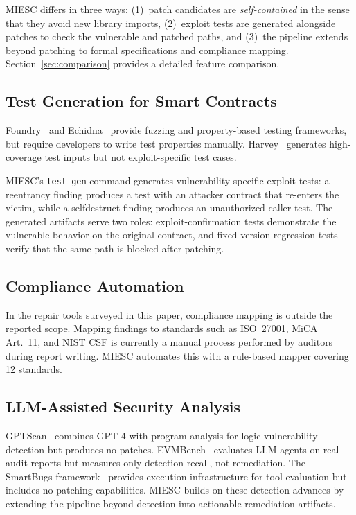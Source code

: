 \documentclass[conference]{IEEEtran}
\begin{document}
MIESC differs in three ways: (1)~patch candidates are \emph{self-contained} in the sense that they avoid new library imports, (2)~exploit tests are generated alongside patches to check the vulnerable and patched paths, and (3)~the pipeline extends beyond patching to formal specifications and compliance mapping. Section~\ref{sec:comparison} provides a detailed feature comparison.

\subsection{Test Generation for Smart Contracts}

Foundry~\cite{foundry2025} and Echidna~\cite{grieco2020echidna} provide fuzzing and property-based testing frameworks, but require developers to write test properties manually. Harvey~\cite{harvey2020} generates high-coverage test inputs but not exploit-specific test cases.

MIESC's \texttt{test-gen} command generates vulnerability-specific exploit tests: a reentrancy finding produces a test with an attacker contract that re-enters the victim, while a selfdestruct finding produces an unauthorized-caller test. The generated artifacts serve two roles: exploit-confirmation tests demonstrate the vulnerable behavior on the original contract, and fixed-version regression tests verify that the same path is blocked after patching.

\subsection{Compliance Automation}

In the repair tools surveyed in this paper, compliance mapping is outside the reported scope. Mapping findings to standards such as ISO~27001, MiCA Art.~11, and NIST CSF is currently a manual process performed by auditors during report writing. MIESC automates this with a rule-based mapper covering 12 standards.

\subsection{LLM-Assisted Security Analysis}

GPTScan~\cite{sun2024gptscan} combines GPT-4 with program analysis for logic vulnerability detection but produces no patches. EVMBench~\cite{evmbench2026} evaluates LLM agents on real audit reports but measures only detection recall, not remediation. The SmartBugs framework~\cite{smartbugs2023} provides execution infrastructure for tool evaluation but includes no patching capabilities. MIESC builds on these detection advances by extending the pipeline beyond detection into actionable remediation artifacts.
\end{document}
